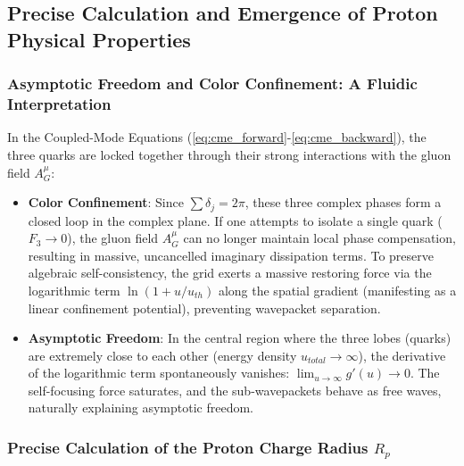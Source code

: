 \documentclass[12pt, a4paper]{article}
\begin{document}
\subsection{Precise Calculation and Emergence of Proton Physical Properties}

\subsubsection{Asymptotic Freedom and Color Confinement: A Fluidic Interpretation}

In the Coupled-Mode Equations (\ref{eq:cme_forward}-\ref{eq:cme_backward}), the three quarks are locked together through their strong interactions with the gluon field $A^\mu_G$:
\begin{itemize}
    \item \textbf{Color Confinement}: Since $\sum \delta_j = 2\pi$, these three complex phases form a closed loop in the complex plane. If one attempts to isolate a single quark ($F_3 \to 0$), the gluon field $A^\mu_G$ can no longer maintain local phase compensation, resulting in massive, uncancelled imaginary dissipation terms. To preserve algebraic self-consistency, the grid exerts a massive restoring force via the logarithmic term $\ln(1+u/u_{th})$ along the spatial gradient (manifesting as a linear confinement potential), preventing wavepacket separation.
    
    \item \textbf{Asymptotic Freedom}: In the central region where the three lobes (quarks) are extremely close to each other (energy density $u_{total} \to \infty$), the derivative of the logarithmic term spontaneously vanishes: $\lim_{u \to \infty} g'(u) \to 0$. The self-focusing force saturates, and the sub-wavepackets behave as free waves, naturally explaining asymptotic freedom.
\end{itemize}

\subsubsection{Precise Calculation of the Proton Charge Radius $R_p$}
\end{document}
